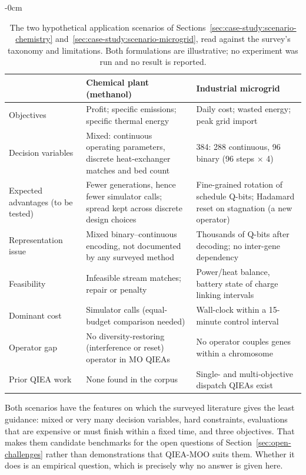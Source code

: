 \begin{table}[H]
  \centering
  \small
  \caption{The two hypothetical application scenarios of
    Sections~\ref{sec:case-study:scenario-chemistry}
    and~\ref{sec:case-study:scenario-microgrid}, read against the
    survey's taxonomy and limitations. Both formulations are
    illustrative; no experiment was run and no result is reported.}
  \label{tab:case-study-scenarios}
  \begin{adjustwidth}{-\extralength}{0cm}
  \centering
  \begin{tabularx}{\linewidth}{@{}>{\raggedright\arraybackslash}p{2.9cm}YY@{}}
    \toprule
    & Chemical plant (methanol) & Industrial microgrid \\
    \midrule
    Objectives & Profit; specific emissions; specific thermal energy &
      Daily cost; wasted energy; peak grid import \\
    Decision variables & Mixed: continuous operating parameters, discrete
      heat-exchanger matches and bed count &
      384: 288 continuous, 96 binary (96 steps $\times$ 4) \\
    Expected advantages (to be tested) & Fewer generations, hence fewer
      simulator calls; spread kept across discrete design choices &
      Fine-grained rotation of schedule Q-bits; Hadamard reset on
      stagnation (a new operator) \\
    Representation issue & Mixed binary--continuous encoding, not
      documented by any surveyed method &
      Thousands of Q-bits after decoding; no inter-gene dependency \\
    Feasibility & Infeasible stream matches; repair or penalty &
      Power/heat balance, battery state of charge linking intervals \\
    Dominant cost & Simulator calls (equal-budget comparison needed) &
      Wall-clock within a 15-minute control interval \\
    Operator gap & No diversity-restoring (interference or reset)
      operator in MO QIEAs & No operator couples genes within a
      chromosome \\
    Prior QIEA work & None found in the corpus &
      Single- and multi-objective dispatch QIEAs exist \\
    \bottomrule
  \end{tabularx}
  \end{adjustwidth}
\end{table}

Both scenarios have the features on which the surveyed literature gives
the least guidance: mixed or very many decision variables, hard
constraints, evaluations that are expensive or must finish within a
fixed time, and three objectives. That makes them candidate benchmarks
for the open questions of Section~\ref{sec:open-challenges} rather than
demonstrations that QIEA-MOO suits them. Whether it does is an
empirical question, which is precisely why no answer is given here.
